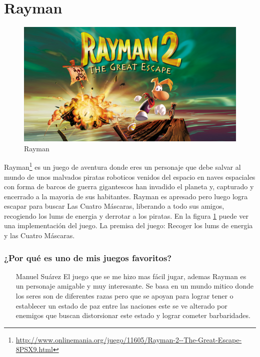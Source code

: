 \section{Rayman}

\begin{figure}[htbp]
\begin{center}
\includegraphics[width=.60\textwidth]{./imagenes/rayman.jpg}
\caption{Rayman}
\label{Rayman}
\end{center}
\end{figure}
Rayman\footnote{\url{http://www.onlinemania.org/juego/11605/Rayman-2--The-Great-Escape-8PSX9.html}} es un juego de aventura donde eres un personaje que debe salvar al mundo de unos malvados piratas roboticos venidos del espacio en naves espaciales con forma de barcos de guerra  gigantescos han invadido el planeta y, capturado y encerrado a la mayoria de sus habitantes. 
Rayman es apresado pero luego logra escapar para buscar Las Cuatro Máscaras, liberando a todo sus amigos, recogiendo los lums de energia y derrotar a los piratas. 
En la figura \ref{Rayman} puede ver una implementación del juego.
La premisa del juego: Recoger los lums de energia y las Cuatro Máscaras.

\subsubsection{¿Por qué es uno de mis juegos favoritos?}
\begin{itemize}
\item[Manuel Suárez] El juego que se me hizo mas fácil jugar, ademas Rayman es un personaje amigable y muy interesante. 
Se basa en un mundo mitico donde los seres son de diferentes razas pero que se apoyan para lograr tener o establecer un estado de paz entre las naciones
este se ve alterado por enemigos que buscan distorsionar este estado y lograr cometer barbaridades. 


\end{itemize}
